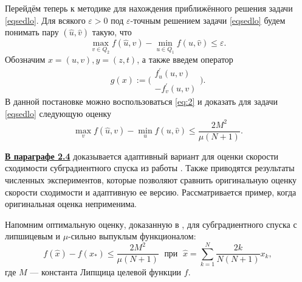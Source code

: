     Перейдём теперь к методике для нахождения приближённого решения задачи \eqref{eqsedlo}. Для всякого $\varepsilon > 0$ под $\varepsilon$-точным решением задачи \eqref{eqsedlo} будем понимать пару $(\widehat{u}, \widehat{v})$ такую, что $$\max_{v \in Q_2} f(\widehat{u}, v) - \min_{u \in Q_1} f(u, \widehat{v}) \leq \varepsilon.$$ Обозначим $x = (u, v), y = (z, t)$, а также введем оператор 
    \begin{equation}\label{operator-sedlo}
        g(x) := \Bigg( 
        \begin{aligned}
            f^{'}_{u}(u,v)\\
            -f^{'}_{v}(u,v)
        \end{aligned}
        \Bigg).
    \end{equation}
    В данной постановке можно воспользоваться \eqref{eq:2} и доказать для задачи \eqref{eqsedlo} следующую оценку
    \begin{equation}
        \max_{v} f(\widehat{u}, v) - \min_{u} f(u, \widehat{v}) \leq \frac{2M^2}{\mu (N+1)}.
    \end{equation}
\fi

\underline{\textbf{В параграфе 2.4}} доказывается адаптивный вариант для оценки скорости сходимости субградиентного спуска из работы \cite{Bach_2012}. Также приводятся результаты численных экспериментов, которые позволяют сравнить оригинальную оценку скорости сходимости и адаптивную ее версию. Рассматривается пример, когда оригинальная оценка неприменима. 

Напомним оптимальную оценку, доказанную в \cite{Bach_2012}, для субградиентного спуска с липшицевым и $\mu$-сильно выпуклым функционалом:
\begin{equation}\label{orig_estimation_f}
    f(\widehat{x}) - f(x_*) \leq \frac{2 M^2}{\mu (N+1)}  \; \text{  при   } \; \widehat{x} = \sum\limits_{k=1}^{N} \frac{2 k}{N (N+1)} x_k, 
\end{equation}
где $M$ --- константа Липщица целевой функции $f$.

